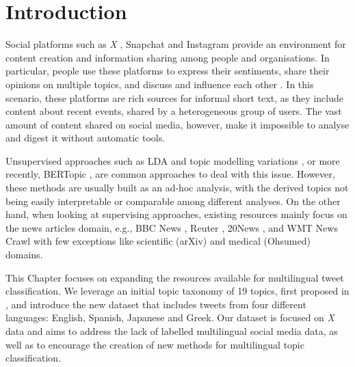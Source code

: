 

\section{Introduction}
Social platforms such as \textit{X} , Snapchat and Instagram provide an environment for content creation and information sharing among people and organisations. In particular, people use these platforms to express their sentiments, share their opinions on multiple topics, and discuss and influence each other \cite{barbieri-etal-2014-modelling,hu2021revealing,ansari2020analysis}. In this scenario, these platforms are rich sources for informal short text, as they include content about recent events, shared by a heterogeneous group of users. The vast amount of content shared on social media, however, make it impossible to analyse and digest it without automatic tools.

Unsupervised approaches such as \ac{LDA} \cite{lda} and topic modelling variations \cite{steyvers2007probabilistic}, or more recently, BERTopic \cite{bertopic}, are common approaches to deal with this issue.
However, these methods are usually built as an ad-hoc analysis, with the derived topics not being easily interpretable or comparable among different analyses. On the other hand, when looking at supervising approaches, existing resources mainly focus on the news articles domain, e.g., BBC News \cite{greene2006practical}, Reuter \cite{lewis2004rcv1}, 20News \cite{lang1995newsweeder}, and WMT News Crawl \cite{lazaridou2021mind} with few exceptions like scientific (arXiv) \cite{lazaridou2021mind} and medical (Ohsumed) \cite{hersh1994ohsumed} domains. 


This Chapter focuses on expanding the resources available for multilingual tweet classification. 
We leverage an initial topic taxonomy of 19 topics, first proposed in , and introduce the new {\XTOPIC} dataset that includes tweets from four different languages: English, Spanish, Japanese and Greek. Our dataset is focused on \textit{X} data and aims to address the lack of labelled multilingual social media data, as well as to encourage the creation of new methods for multilingual topic classification. 

